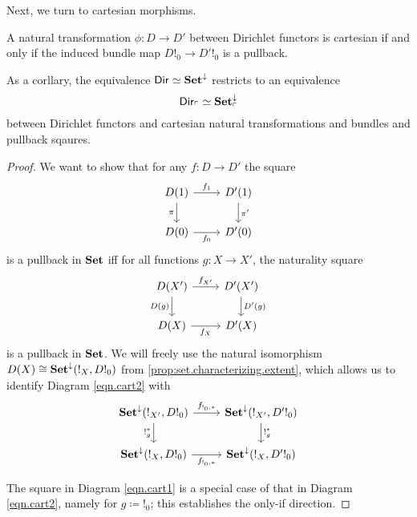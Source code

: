 Next, we turn to cartesian morphisms.
\begin{prop}
A natural transformation $\phi : D \to D'$ between Dirichlet functors is
cartesian if and only if the induced bundle map $D!_0 \to D'!_0$ is a pullback.

As a corllary, the equivalence $\operatorname{\mathsf{{Dir}}} \simeq \operatorname{\textbf{Set}}^{\downarrow}$ restricts to an
equivalence
$$\operatorname{\mathsf{{Dir}}}_{\ulcorner} \simeq \operatorname{\textbf{Set}}^{\downarrow}_{\ulcorner}$$
between Dirichlet functors and cartesian natural transformations and bundles and
pullback sqaures.
\end{prop}
\begin{proof}
We want to show that for any $f\colon D\to D'$ the square
\begin{equation}\label{eqn.cart1}
\begin{tikzcd}
	D(1)\ar[r, "f_1"]\ar[d, "\pi"']&
	D'(1)\ar[d, "\pi'"]\\
	D(0)\ar[r, "f_0"']&
	D'(0)
\end{tikzcd}
\end{equation}
is a pullback in $\operatorname{\textbf{Set}}$ iff for all functions $g\colon X\to X'$, the naturality square
\begin{equation}\label{eqn.cart2}
\begin{tikzcd}
  D(X')\ar[r, "f_{X'}"]\ar[d, "D(g)"']&
  D'(X')\ar[d, "D'(g)"]\\
  D(X)\ar[r, "f_X"']&
  D'(X)
\end{tikzcd}
\end{equation}
is a pullback in $\operatorname{\textbf{Set}}$. We will freely use the natural isomorphism
$D(X)\cong\operatorname{\textbf{Set}}^{\downarrow}(!_X, D!_0)$ from
\ref{prop:set.characterizing.extent}, which allows us to identify Diagram
\ref{eqn.cart2} with
\begin{equation}\label{eqn:cart3}
\begin{tikzcd}
 \Set^{\downarrow}(!_{X'}, D!_0)     \ar[r, "f_{!_0,\ast}"]\ar[d, "!_g^{\ast}"']& \Set^{\downarrow}(!_{X'}, D'!_0)
  \ar[d, "!_{g}^{\ast}"]\\
  \Set^{\downarrow}(!_{X}, D!_0)\ar[r, "f_{!_0, \ast}"']&
 \Set^{\downarrow}(!_X, D'!_0) 
\end{tikzcd}
\end{equation}

The square in Diagram \ref{eqn.cart1} is a
special case of that in Diagram \ref{eqn.cart2}, namely for $g\coloneqq !_0$;
this establishes the only-if direction. 


\end{proof}
